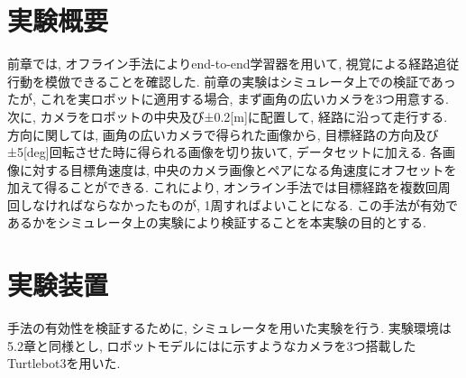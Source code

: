 
\section{実験概要}
前章では, オフライン手法によりend-to-end学習器を用いて, 視覚による経路追従行動を模倣できることを確認した. 前章の実験はシミュレータ上での検証であったが, これを実ロボットに適用する場合, まず画角の広いカメラを3つ用意する. 次に, カメラをロボットの中央及び±0.2[m]に配置して, 経路に沿って走行する. 方向に関しては, 画角の広いカメラで得られた画像から, 目標経路の方向及び±5[deg]回転させた時に得られる画像を切り抜いて, データセットに加える. 各画像に対する目標角速度は, 中央のカメラ画像とペアになる角速度にオフセットを加えて得ることができる. これにより, オンライン手法では目標経路を複数回周回しなければならなかったものが, 1周すればよいことになる. この手法が有効であるかをシミュレータ上の実験により検証することを本実験の目的とする. 



\section{実験装置}
手法の有効性を検証するために, シミュレータを用いた実験を行う. 実験環境は5.2章と同様とし, ロボットモデルにはに示すようなカメラを3つ搭載したTurtlebot3\cite{turtlebot3}を用いた.

